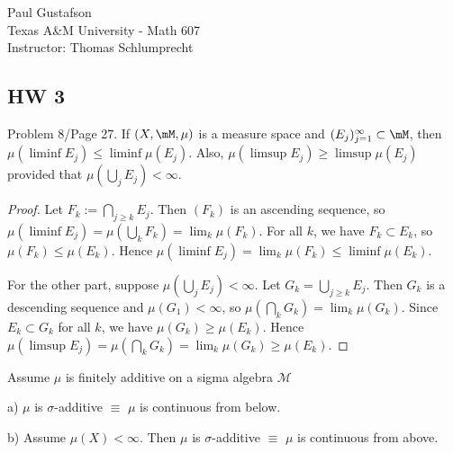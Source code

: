 \documentclass{article}
\begin{document}
\noindent Paul Gustafson\\
\noindent Texas A\&M University - Math 607\\ 
\noindent Instructor: Thomas Schlumprecht

\subsection*{HW 3}

 Problem 8/Page 27. If $(X, \mM, \mu)$ is a measure space and $(E_j)_{j=1}^\infty \subset \mM$, then $\mu(\liminf E_j) \le \liminf \mu(E_j)$. Also, $\mu(\limsup E_j) \ge \limsup \mu(E_j)$ provided that $\mu(\bigcup_j E_j) < \infty$.

\begin{proof}
Let $F_k := \bigcap_{j \ge k} E_j$. Then $(F_k)$ is an ascending sequence, so $\mu(\liminf E_j) = \mu(\bigcup_k F_k) = \lim_k \mu(F_k)$. For all $k$, we have $F_k \subset E_k$, so $\mu(F_k) \le \mu(E_k)$. Hence $\mu(\liminf E_j) = \lim_k \mu(F_k) \le \liminf \mu(E_k)$.

For the other part, suppose $\mu(\bigcup_j E_j) < \infty$. Let $G_k = \bigcup_{j \ge k} E_j$. Then $G_k$ is a descending sequence and $\mu(G_1) < \infty$, so $\mu( \bigcap_k G_k) = \lim_k \mu(G_k)$. Since $E_k \subset G_k$ for all $k$, we have $\mu(G_k) \ge \mu(E_k)$.  Hence $\mu(\limsup E_j) = \mu(\bigcap_k G_k) = \lim_k \mu(G_k) \ge \mu(E_k)$.

\end{proof}

 Assume $\mu$ is finitely additive on a sigma algebra $\mathcal M$

a) $\mu$ is $\sigma$-additive $\equiv$ $\mu$ is continuous from below.

b) Assume $\mu(X) < \infty$. Then $\mu$ is $\sigma$-additive $\equiv$ $\mu$ is continuous from above.
\end{document}
